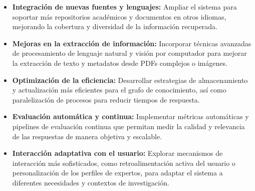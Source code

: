 \documentclass[12pt]{article}
\begin{document}
\begin{itemize}
\item \textbf{Integración de nuevas fuentes y lenguajes:} Ampliar el sistema para soportar más repositorios académicos y documentos en otros idiomas, mejorando la cobertura y diversidad de la información recuperada.
\item \textbf{Mejoras en la extracción de información:} Incorporar técnicas avanzadas de procesamiento de lenguaje natural y visión por computador para mejorar la extracción de texto y metadatos desde PDFs complejos o imágenes.
\item \textbf{Optimización de la eficiencia:} Desarrollar estrategias de almacenamiento y actualización más eficientes para el grafo de conocimiento, así como paralelización de procesos para reducir tiempos de respuesta.
\item \textbf{Evaluación automática y continua:} Implementar métricas automáticas y pipelines de evaluación continua que permitan medir la calidad y relevancia de las respuestas de manera objetiva y escalable.
\item \textbf{Interacción adaptativa con el usuario:} Explorar mecanismos de interacción más sofisticados, como retroalimentación activa del usuario o personalización de los perfiles de expertos, para adaptar el sistema a diferentes necesidades y contextos de investigación.
\end{itemize}



\end{document}
